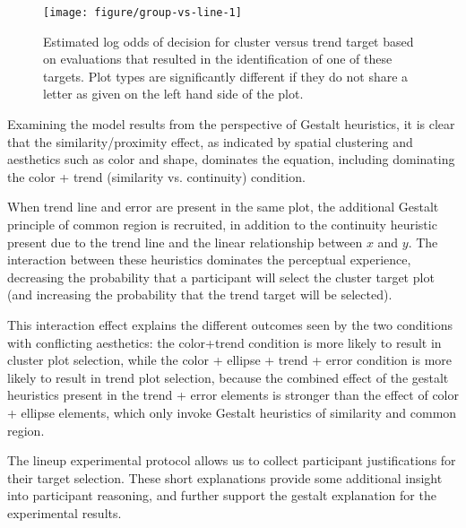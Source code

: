 \documentclass[12pt]{article}\usepackage[]{graphicx}\usepackage[]{color}
\newenvironment{knitrout}{}{} %
\begin{document}
\begin{figure}[ht]\centering
\begin{knitrout}
\color{fgcolor}

{\centering \texttt{[image: figure/group-vs-line-1]} 

}



\end{knitrout}
\caption[Estimated log odds of decision for cluster versus trend target]{\label{fig:faceoff} Estimated log odds of decision for cluster versus trend target based on evaluations that resulted in the identification of one of these targets. Plot types are significantly different if they do not share a letter as given on the left hand side of the plot.}
\end{figure}

Examining the model results from the perspective of Gestalt heuristics, it is clear that the similarity/proximity effect, as indicated by spatial clustering and aesthetics such as color and shape, dominates the equation, including dominating the color + trend (similarity vs. continuity) condition. 

When trend line and error are present in the same plot, the additional Gestalt principle of common region is recruited, in addition to the continuity heuristic present due to the trend line and the linear relationship between $x$ and $y$. The interaction between these heuristics dominates the perceptual experience, decreasing the probability that a participant will select the cluster target plot (and increasing the probability that the trend target will be selected). 

This interaction effect explains the different outcomes seen by the two conditions with conflicting aesthetics: the color+trend condition is more likely to result in cluster plot selection, while the color + ellipse + trend + error condition is more likely to result in trend plot selection, because the combined effect of the gestalt heuristics present in the trend + error elements is stronger than the effect of color + ellipse elements, which only invoke Gestalt heuristics of similarity and common region. 

The lineup experimental protocol allows us to collect participant justifications for their target selection. These short explanations provide some additional insight into participant reasoning, and further support the gestalt explanation for the experimental results. 
\end{document}
